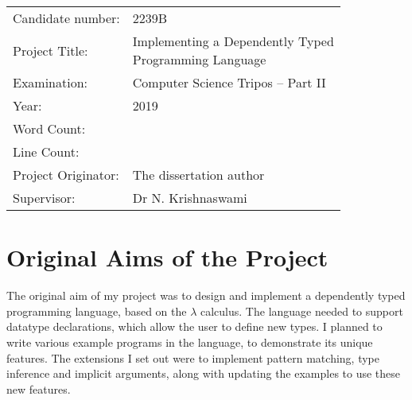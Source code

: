 \documentclass[12pt,a4paper,twoside]{report}
\begin{document}
{\large
    \begin{tabular}{ll}
        Candidate number:   & 2239B                                                                                                                                                                        \\
        Project Title:      & \makecell[lt]{Implementing a Dependently Typed                                                                                                                               \\ Programming Language} \\
        Examination:        & Computer Science Tripos -- Part II                                                                                                                                           \\
        Year:               & 2019                                                                                                                                                                         \\
        Word Count:         &                                                                                                                                          \\
        Line Count:         &  \\
        Project Originator: & The dissertation author                                                                                                                                                   \\
        Supervisor:         & Dr N. Krishnaswami                                                                                                                                                           \\
    \end{tabular}
}

\section*{Original Aims of the Project}

The original aim of my project was to design and implement a dependently typed programming language, based on the \(\lambda\) calculus.
The language needed to support datatype declarations, which allow the user to define new types.
I planned to write various example programs in the language, to demonstrate its unique features.
The extensions I set out were to implement pattern matching, type inference and implicit arguments, along with updating the examples to use these new features.
\end{document}
